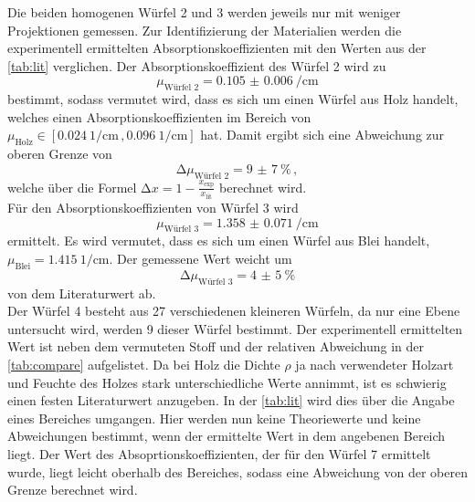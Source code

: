 \noindent Die beiden homogenen Würfel 2 und 3 werden jeweils nur mit weniger Projektionen gemessen. Zur Identifizierung der Materialien werden die 
experimentell ermittelten Absorptionskoeffizienten mit den Werten aus der \autoref{tab:lit} verglichen. Der Absorptionskoeffizient des Würfel 2 wird zu
\begin{equation*}
    \mu_{\text{Würfel 2}} = \SI{0.105(6)}{\per\centi\metre}
\end{equation*}
bestimmt, sodass vermutet wird, dass es sich um einen Würfel aus Holz handelt, welches einen Absorptionskoeffizienten im Bereich von $\mu_{\text{Holz}} \in
[\SI{0.024}{1\per\centi\metre}\, , \SI{0.096}{1\per\centi\metre}]$ hat. Damit ergibt sich eine Abweichung zur oberen Grenze von 
\begin{equation*}
    \increment \mu_{\text{Würfel 2}} = \SI{9(7)}{\percent}\, ,
\end{equation*}
welche über die Formel $\increment x = 1 - \frac{x_{\text{exp}}}{x_{\text{lit}}}$ berechnet wird. \\
Für den Absorptionskoeffizienten von Würfel 3 wird 
\begin{equation*}
    \mu_{\text{Würfel 3}} = \SI{1.358(71)}{\per\centi\metre}
\end{equation*}
ermittelt. Es wird vermutet, dass es sich um einen Würfel aus Blei handelt, $\mu_{\text{Blei}} = \SI{1.415}{1\per\centi\metre}$. Der gemessene Wert 
weicht um 
\begin{equation*}
    \increment \mu_{\text{Würfel 3}} = \SI{4(5)}{\percent}
\end{equation*}
von dem Literaturwert ab.\\
Der Würfel 4 besteht aus 27 verschiedenen kleineren Würfeln, da nur eine Ebene untersucht wird, werden 9 dieser Würfel bestimmt. Der experimentell ermittelten 
Wert ist neben dem vermuteten Stoff und der relativen Abweichung in der \autoref{tab:compare} aufgelistet. Da bei Holz die Dichte $\rho$ ja nach verwendeter Holzart
und Feuchte des Holzes stark unterschiedliche Werte annimmt, ist es schwierig einen festen Literaturwert anzugeben. In der \autoref{tab:lit} wird dies über die 
Angabe eines Bereiches umgangen. Hier werden nun keine Theoriewerte und keine Abweichungen bestimmt, wenn der ermittelte Wert in dem angebenen Bereich liegt. 
Der Wert des Absoprtionskoeffizienten, der für den Würfel 7 ermittelt wurde, liegt leicht oberhalb des Bereiches, sodass eine Abweichung von der oberen Grenze 
berechnet wird. 

